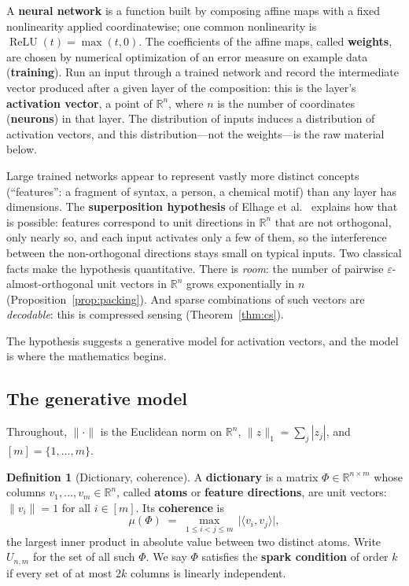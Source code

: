 \documentclass[11pt]{amsart}
\theoremstyle{plain}
\theoremstyle{definition}
\newtheorem{definition}[theorem]{Definition}
\newcommand{\R}{\mathbb{R}}
\DeclareMathOperator{\relu}{ReLU}
\begin{document}
A \textbf{neural network} is a function built by composing affine maps with a fixed nonlinearity applied coordinatewise; one common nonlinearity is $\relu(t)=\max(t,0)$. The coefficients of the affine maps, called \textbf{weights}, are chosen by numerical optimization of an error measure on example data (\textbf{training}). Run an input through a trained network and record the intermediate vector produced after a given layer of the composition: this is the layer's \textbf{activation vector}, a point of $\R^n$, where $n$ is the number of coordinates (\textbf{neurons}) in that layer. The distribution of inputs induces a distribution of activation vectors, and this distribution---not the weights---is the raw material below.

Large trained networks appear to represent vastly more distinct concepts (``features'': a fragment of syntax, a person, a chemical motif) than any layer has dimensions. The \textbf{superposition hypothesis} of Elhage et al.~\cite{elhage2022} explains how that is possible: features correspond to unit directions in $\R^n$ that are not orthogonal, only nearly so, and each input activates only a few of them, so the interference between the non-orthogonal directions stays small on typical inputs. Two classical facts make the hypothesis quantitative. There is \emph{room}: the number of pairwise $\varepsilon$-almost-orthogonal unit vectors in $\R^n$ grows exponentially in $n$ (Proposition~\ref{prop:packing}). And sparse combinations of such vectors are \emph{decodable}: this is compressed sensing (Theorem~\ref{thm:cs}).

The hypothesis suggests a generative model for activation vectors, and the model is where the mathematics begins.

\subsection{The generative model}

Throughout, $\|\cdot\|$ is the Euclidean norm on $\R^n$, $\|z\|_1=\sum_j |z_j|$, and $[m]=\{1,\dots,m\}$.

\begin{definition}[Dictionary, coherence]\label{def:coherence}
A \textbf{dictionary} is a matrix $\Phi\in\R^{n\times m}$ whose columns $v_1,\dots,v_m\in\R^n$, called \textbf{atoms} or \textbf{feature directions}, are unit vectors: $\|v_i\|=1$ for all $i\in[m]$. Its \textbf{coherence} is
\[
  \mu(\Phi)\;=\;\max_{1\le i<j\le m}\,\lvert\langle v_i,v_j\rangle\rvert,
\]
the largest inner product in absolute value between two distinct atoms. Write $U_{n,m}$ for the set of all such $\Phi$. We say $\Phi$ satisfies the \textbf{spark condition} of order $k$ if every set of at most $2k$ columns is linearly independent.
\end{definition}
\end{document}
